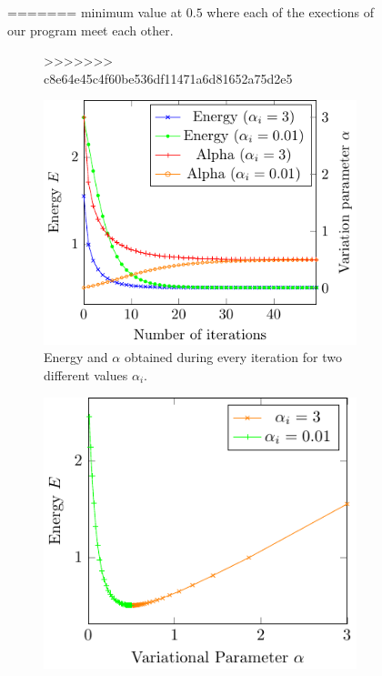 \begin{figure}
=======
minimum value at $0.5$ where each of the exections of our program meet each other.
\begin{figure}[th]
>>>>>>> c8e64e45c4f60be536df11471a6d81652a75d2e5
	\begin{center}
		\includegraphics[scale=0.9]{graphs/ho-e-alpha-iterations.pdf}
		\caption{
			Energy and $\alpha$ obtained during every iteration for two different values $\alpha_i$.
			}
		\label{fig:Ho_it}
	\end{center}
\end{figure}
\begin{figure}[th]
	\begin{center}
		\includegraphics[scale=0.9]{graphs/ho-e-alpha.pdf}

\end{center}
\end{figure}
\end{figure}
